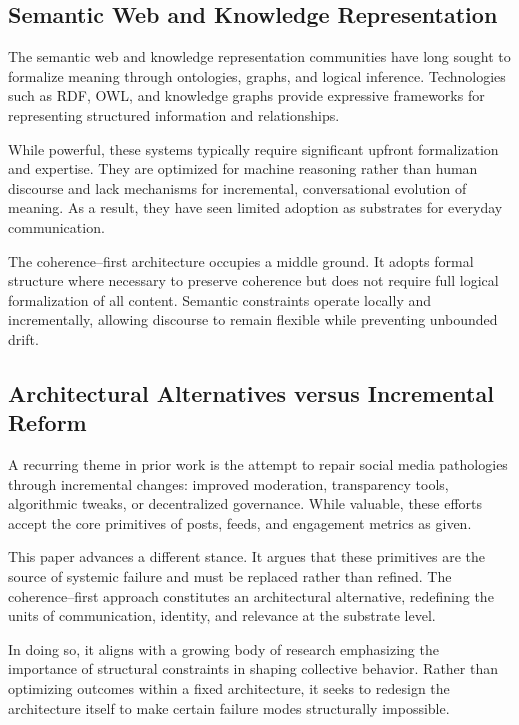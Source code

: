 \documentclass[11pt]{article}
\begin{document}
\subsection{Semantic Web and Knowledge Representation}

The semantic web and knowledge representation communities have long sought to formalize
meaning through ontologies, graphs, and logical inference. Technologies such as RDF, OWL,
and knowledge graphs provide expressive frameworks for representing structured information
and relationships.

While powerful, these systems typically require significant upfront formalization and
expertise. They are optimized for machine reasoning rather than human discourse and lack
mechanisms for incremental, conversational evolution of meaning. As a result, they have
seen limited adoption as substrates for everyday communication.

The coherence--first architecture occupies a middle ground. It adopts formal structure
where necessary to preserve coherence but does not require full logical formalization of
all content. Semantic constraints operate locally and incrementally, allowing discourse to
remain flexible while preventing unbounded drift.

\subsection{Architectural Alternatives versus Incremental Reform}

A recurring theme in prior work is the attempt to repair social media pathologies through
incremental changes: improved moderation, transparency tools, algorithmic tweaks, or
decentralized governance. While valuable, these efforts accept the core primitives of
posts, feeds, and engagement metrics as given.

This paper advances a different stance. It argues that these primitives are the source of
systemic failure and must be replaced rather than refined. The coherence--first approach
constitutes an architectural alternative, redefining the units of communication, identity,
and relevance at the substrate level.

In doing so, it aligns with a growing body of research emphasizing the importance of
structural constraints in shaping collective behavior. Rather than optimizing outcomes
within a fixed architecture, it seeks to redesign the architecture itself to make certain
failure modes structurally impossible.
\end{document}
